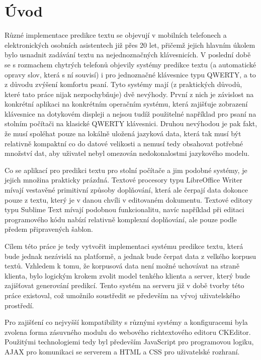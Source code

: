 \documentclass{article}
\begin{document}
\tableofcontents

\section{Úvod}

Různé implementace predikce textu se objevují v mobilních telefonech a elektronických osobních asistentech již přes 20 let, přičemž jejich hlavním úkolem bylo usnadnit zadávání textu na nejednoznačných klávesnicích. V poslední době se s rozmachem chytrých telefonů objevily systémy predikce textu (a automatické opravy slov, která s ní souvisí) i pro jednoznačné klávesnice typu QWERTY, a to z důvodu zvýšení komfortu psaní. Tyto systémy mají (z praktických důvodů, které tato práce nijak nezpochybňuje) dvě nevýhody. První z nich je závislost na konkrétní aplikaci na konkrétním operačním systému, která zajišťuje zobrazení klávesnice na dotykovém displeji a nejsou tudíž použitelné například pro psaní na stolním počítači na klasické QWERTY klávesnici. Druhou nevýhodou je pak fakt, že musí spoléhat pouze na lokálně uložená jazyková data, která tak musí být relativně kompaktní co do datové velikosti a nemusí tedy obsahovat potřebné množství dat, aby uživatel nebyl omezován nedokonalostmi jazykového modelu.

Co se aplikací pro predikci textu pro stolní počítače a jim podobné systémy, je jejich množina prakticky prázdná. Textové procesory typu LibreOffice Writer mívají vestavěné primitivní způsoby doplňování, která ale čerpají data dokonce pouze z textu, který je v danou chvíli v editovaném dokumentu. Textové editory typu Sublime Text mívají podobnou funkcionalitu, navíc například při editaci programového kódu nabízí relativně komplexní doplňování, ale pouze podle předem připravených šablon.

Cílem této práce je tedy vytvořit implementaci systému predikce textu, která bude jednak nezávislá na platformě, a jednak bude čerpat data z velkého korpusu textů. Vzhledem k tomu, že korpusová data není možné uchovávat na straně klienta, bylo logickým krokem zvolit model tenkého klienta a server, který bude zajišťovat generování predikcí. Tento systém na serveru již v době tvorby této práce existoval, což umožnilo soustředit se především na vývoj uživatelského prostředí. 

Pro zajišťení co nejvyšší kompatibility s různými systémy a konfiguracemi byla zvolena forma zásuvného modulu do webového richtextového editoru CKEditor. Použitými technologiemi tedy byl především JavaScript pro programovou logiku, AJAX pro komunikaci se serverem a HTML a CSS pro uživatelské rozhraní.
\end{document}
